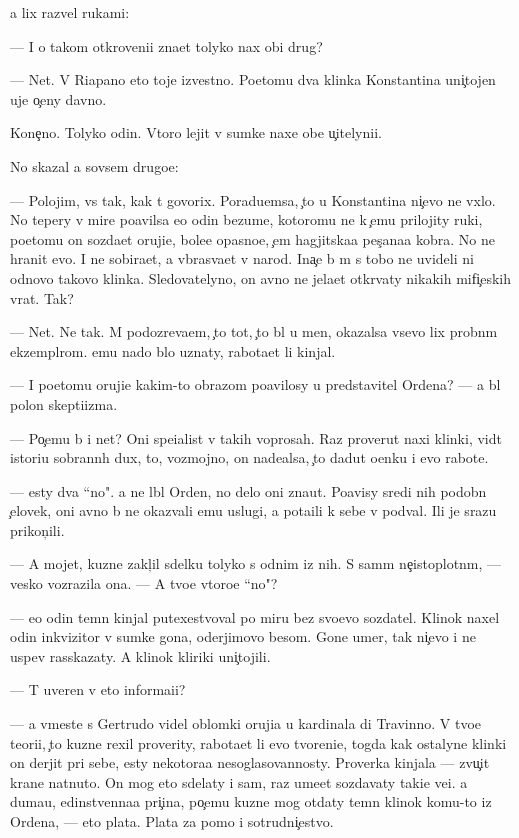 \documentclass[10pt]{book}
\begin{document}
{\Y}a lix razvel rukami:

— I o takom otkroveni{\y}i zna{\y}et tolyko nax ob{\x}i{\y} drug?

— Net. V Riapano eto toje izvestno. Poetomu dva klinka Konstantina uni{\c}tojen{\yi} uje o{\c}eny davno.

Kone{\c}no. Tolyko odin. Vtoro{\y} lejit v sumke naxe{\y} ob{\x}e{\y} u{\c}itelyni{\q}i.

No skazal {\y}a sovsem drugo{\y}e:

— Polojim, vs{\e} tak, kak t{\yi} govorix. Poradu{\y}emsa, {\c}to u Konstantina ni{\c}evo ne v{\yi}xlo. No tepery v mire po{\y}avilsa {\y}e{\x}o odin bezume{\q}, kotoromu ne k {\c}emu prilojity ruki, poetomu on sozda{\y}et oruji{\y}e, bole{\y}e opasno{\y}e, {\c}em hagjitska{\y}a pes{\c}ana{\y}a kobra. No ne hranit {\y}evo. I ne sobira{\y}et, a v{\yi}bras{\yi}va{\y}et v narod. Ina{\c}e b{\yi} m{\yi} s tobo{\y} ne uvideli ni odnovo takovo klinka. Sledovatelyno, on {\y}avno ne jela{\y}et otkr{\yi}vaty nikakih mifi{\c}eskih vrat. Tak?

— Net. Ne tak. M{\yi} podozreva{\y}em, {\c}to tot, {\c}to b{\yi}l u men{\ia}, okazalsa vsevo lix probn{\yi}m ekzempl{\ia}rom. {\Y}emu nado b{\yi}lo uznaty, rabota{\y}et li kinjal.

— I poetomu oruji{\y}e kakim-to obrazom po{\y}avilosy u predstavitel{\ia} Ordena? — {\Y}a b{\yi}l polon skepti{\q}izma.

— Po{\c}emu b{\yi} i net? Oni spe{\q}ialist{\yi} v takih voprosah. Raz prover{\ia}{\y}ut naxi klinki, vid{\ia}t istori{\y}u sobrann{\yi}h dux, to, vozmojno, on nade{\y}alsa, {\c}to dadut o{\q}enku i {\y}evo rabote.

— {\Y}esty dva ``no". {\Y}a ne l{\iu}bl{\iu} Orden, no delo oni zna{\y}ut. Po{\y}avisy sredi nih podobn{\yi}{\y} {\c}elovek, oni {\y}avno b{\yi} ne okaz{\yi}vali {\y}emu uslugi, a pota{\x}ili k sebe v podval{\yi}. Ili je srazu prikon{\c}ili.

— A mojet, kuzne{\q} zakl{\iu}{\c}il sdelku tolyko s odnim iz nih. S sam{\yi}m ne{\c}istoplotn{\yi}m, — vesko vozrazila ona. — A tvo{\y}e vtoro{\y}e ``no"?

— {\y}e{\x}o odin temn{\yi}{\y} kinjal putexestvoval po miru bez svo{\y}evo sozdatel{\ia}. Klinok naxel odin inkvizitor v sumke gon{\q}a, oderjimovo besom. Gone{\q} umer, tak ni{\c}evo i ne uspev rasskazaty. A klinok kliriki uni{\c}tojili.

— T{\yi} uveren v eto{\y} informa{\q}i{\y}i?

— {\Y}a vmeste s Gertrudo{\y} videl oblomki oruji{\y}a u kardinala di Travinno. V tvo{\y}e{\y} teori{\y}i, {\c}to kuzne{\q} rexil proverity, rabota{\y}et li {\y}evo tvoreni{\y}e, togda kak ostalyn{\yi}{\y}e klinki on derjit pri sebe, {\y}esty nekotora{\y}a nesoglasovannosty. Proverka kinjala — zvu{\c}it kra{\y}ne nat{\ia}nuto. On mog eto sdelaty i sam, raz ume{\y}et sozdavaty taki{\y}e ve{\x}i. {\Y}a duma{\y}u, {\y}edinstvenna{\y}a pri{\c}ina, po{\c}emu kuzne{\q} mog otdaty temn{\yi}{\y} klinok komu-to iz Ordena, — eto plata. Plata za pomo{\x} i sotrudni{\c}estvo.
\end{document}
